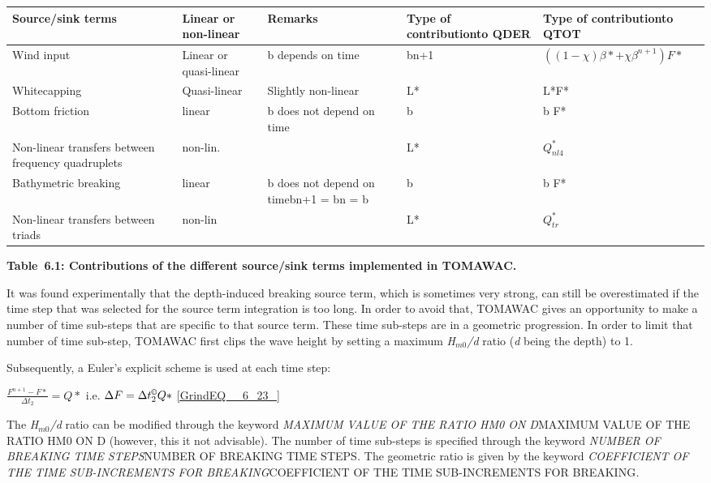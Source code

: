  

\begin{tabular}{|p{0.9in}|p{0.5in}|p{1.0in}|p{1.0in}|p{1.1in}|} \hline
Source/sink terms & Linear or non-linear & Remarks & Type of contributionto QDER & Type of contributionto QTOT \\ \hline
Wind input\newline  & Linear or quasi-linear & b depends on time & bn+1 & $\left((1-\chi )\beta *+\chi \beta ^{n+1} \right)F*$ \\ \hline
Whitecapping & Quasi-linear & Slightly non-linear & L* & L*F* \\ \hline
Bottom friction & linear & b does not depend on time & b & b F* \\ \hline
Non-linear transfers between frequency quadruplets & non-lin. &  & L* & $Q_{nl4}^{*} $ \\ \hline
Bathymetric breaking & linear & b does not depend on time\newline bn+1 = bn = b & b & b F* \\ \hline
Non-linear transfers between triads & non-lin &  & L* & $Q_{tr}^{*} $ \\ \hline
\end{tabular}

\textbf{Table~6.1: Contributions of the different source/sink terms implemented in TOMAWAC.}

 It was found experimentally that the depth-induced breaking source term, which is sometimes very strong, can still be overestimated if the time step that was selected for the source term integration is too long. In order to avoid that, TOMAWAC gives an opportunity to make a number of time sub-steps that are specific to that source term. These time sub-steps are in a geometric progression. In order to limit that number of time sub-step, TOMAWAC first clips the wave height by setting a maximum \textit{H${}_{m0}$/d} ratio (\textit{d} being the depth) to 1.

 Subsequently, a Euler's explicit scheme is used at each time step:

$\frac{F^{n+1} -F*}{\Delta t_{2} } =Q*$  i.e.  $\Delta F=\Delta t_{2}^{\copyright } Q*$ \eqref{GrindEQ__6_23_}

 The \textit{H${}_{m0}$/d} ratio can be modified through the keyword \textit{MAXIMUM VALUE OF THE RATIO HM0 ON D}MAXIMUM VALUE OF THE RATIO HM0 ON D\textit{ }(however, this it not advisable). The number of time sub-steps is specified through the keyword \textit{NUMBER OF BREAKING TIME STEPS}NUMBER OF BREAKING TIME STEPS\textit{.} The geometric ratio is given by the keyword \textit{COEFFICIENT OF THE TIME SUB-INCREMENTS FOR BREAKING}COEFFICIENT OF THE TIME SUB-INCREMENTS FOR BREAKING\textit{.}


